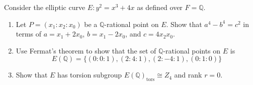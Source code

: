 \documentclass[12 pt, letterpaper]{hmcpset}
\begin{document}
\pagebreak

\begin{problem}[Problem 3.]
	Consider the elliptic curve $E : y^{2} = x^{3} + 4x$ as defined over $F = \mathbb{Q}$.
	\begin{enumerate}
		\item Let $P = (x_{1} : x_{2} : x_{0})$ be a $\mathbb{Q}$-rational point on $E$. Show that $a^{4} - b^{4} = c^{2}$ in terms of $a = x_{1} + 2 x_{0}$, $b = x_{1} - 2 x_{0}$, and $c = 4 x_{2} x_{0}$.
		\item Use Fermat's theorem to show that the set of $\mathbb{Q}$-rational points on $E$ is
			\[
				E(\mathbb{Q}) = \{ (0 : 0 : 1), (2 : 4 : 1), (2 : -4 : 1), (0 : 1 : 0) \}
			\]
		\item Show that $E$ has torsion subgroup $E(\mathbb{Q})_{\text{tors}} \cong Z_{4}$ and rank $r = 0$.
	\end{enumerate}
\end{problem}
\end{document}
